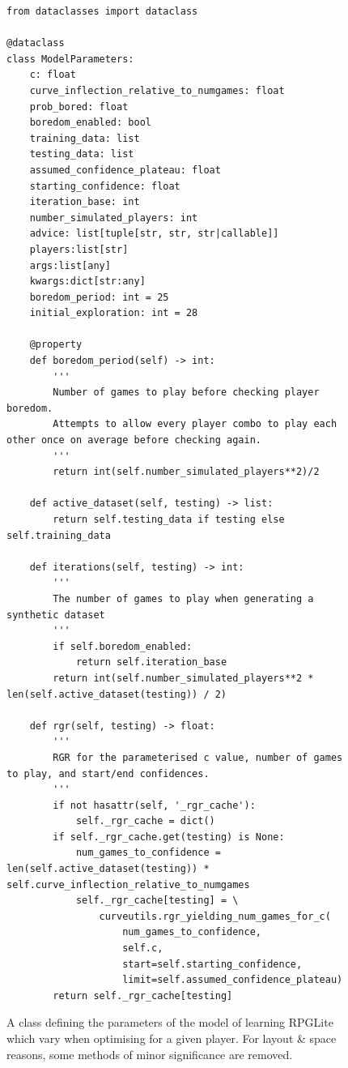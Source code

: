 \begin{figure}
  \begin{center}
    \begin{lstlisting}
from dataclasses import dataclass

@dataclass
class ModelParameters:
    c: float
    curve_inflection_relative_to_numgames: float
    prob_bored: float
    boredom_enabled: bool
    training_data: list
    testing_data: list
    assumed_confidence_plateau: float
    starting_confidence: float
    iteration_base: int
    number_simulated_players: int
    advice: list[tuple[str, str, str|callable]]
    players:list[str]
    args:list[any]
    kwargs:dict[str:any]
    boredom_period: int = 25
    initial_exploration: int = 28

    @property
    def boredom_period(self) -> int:
        '''
        Number of games to play before checking player boredom.
        Attempts to allow every player combo to play each other once on average before checking again.
        '''
        return int(self.number_simulated_players**2)/2

    def active_dataset(self, testing) -> list:
        return self.testing_data if testing else self.training_data

    def iterations(self, testing) -> int:
        '''
        The number of games to play when generating a synthetic dataset
        '''
        if self.boredom_enabled:
            return self.iteration_base
        return int(self.number_simulated_players**2 * len(self.active_dataset(testing)) / 2)

    def rgr(self, testing) -> float:
        '''
        RGR for the parameterised c value, number of games to play, and start/end confidences.
        '''
        if not hasattr(self, '_rgr_cache'):
            self._rgr_cache = dict()
        if self._rgr_cache.get(testing) is None:
            num_games_to_confidence = len(self.active_dataset(testing)) * self.curve_inflection_relative_to_numgames
            self._rgr_cache[testing] = \
                curveutils.rgr_yielding_num_games_for_c(
                    num_games_to_confidence,
                    self.c,
                    start=self.starting_confidence,
                    limit=self.assumed_confidence_plateau)
        return self._rgr_cache[testing]
    \end{lstlisting}
  \end{center}
  \caption{A class defining the parameters of the model of learning RPGLite which vary when optimising for a given player. For layout \& space reasons, some methods of minor significance are removed.}
  \label{fig:model_parameters_class}
\end{figure}

